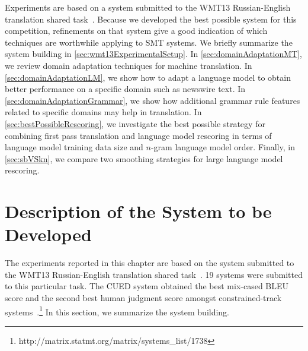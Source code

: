 Experiments are based on a system submitted to the WMT13
Russian-English translation shared
task~\citep{pino-waite-xiao-degispert-flego-byrne:2013:WMT}.
Because we developed the best possible system for this competition, %
refinements on that system give a good indication of which techniques
are worthwhile applying to SMT systems.
We briefly summarize the system building in
\autoref{sec:wmt13ExperimentalSetup}.
In \autoref{sec:domainAdaptationMT}, we review domain adaptation
techniques for machine translation. In \autoref{sec:domainAdaptationLM},
we show how to adapt a language model to obtain better performance
on a specific domain such as newswire text.
In \autoref{sec:domainAdaptationGrammar}, we show how additional
grammar rule features related to specific domains may help in translation.
In \autoref{sec:bestPossibleRescoring}, we investigate
the best possible strategy for combining first pass translation
and language model rescoring in terms of language model
training data size and $n$-gram language model order.
Finally, in \autoref{sec:sbVSkn}, we compare two smoothing
strategies for large language model rescoring.

\section{Description of the System to be Developed}
\label{sec:wmt13ExperimentalSetup}

The experiments reported in this chapter are based
on the system submitted to the WMT13 Russian-English translation shared
task~\citep{pino-waite-xiao-degispert-flego-byrne:2013:WMT}.
19 systems were submitted to this particular task. The
CUED system obtained the best mix-cased BLEU
score and the second best human judgment score
amongst constrained-track
systems~\citep{bojar-buck-callisonburch-federmann-haddow-koehn-monz-post-soricut-specia:2013:WMT}.\footnote{http://matrix.statmt.org/matrix/systems\_list/1738}
In this section, we summarize the system building.

